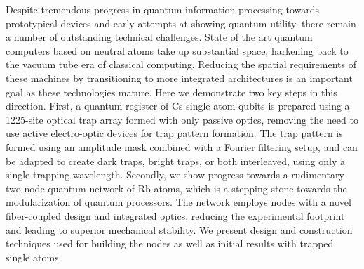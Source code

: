 
\vcinfo{}

Despite tremendous progress in quantum information processing towards prototypical devices and early attempts at showing quantum utility, there remain a number of outstanding technical challenges. State of the art quantum computers based on neutral atoms take up substantial space, harkening back to the vacuum tube era of classical computing. Reducing the spatial requirements of these machines by transitioning to more integrated architectures is an important goal as these technologies mature. Here we demonstrate two key steps in this direction. First, a quantum register of Cs single atom qubits is prepared using a 1225-site optical trap array formed with only passive optics, removing the need to use active electro-optic devices for trap pattern formation. The trap pattern is formed using an amplitude mask combined with a Fourier filtering setup, and can be adapted to create dark traps, bright traps, or both interleaved, using only a single trapping wavelength.  Secondly, we show progress towards a rudimentary two-node quantum network of Rb atoms, which is a stepping stone towards the modularization of quantum processors. The network employs nodes with a novel fiber-coupled design and integrated optics, reducing the experimental footprint and leading to superior mechanical stability. We present design and construction techniques used for building the nodes as well as initial results with trapped single atoms.



